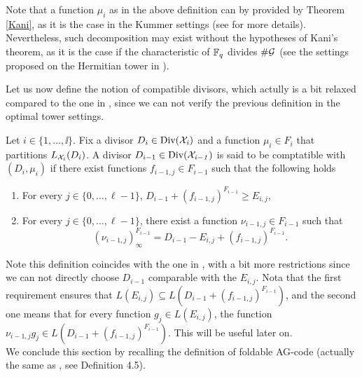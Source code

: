 \documentclass[10pt]{article}
\begin{document}
\s

\begin{rq1} \rm
Note that a function $\mu_i$ as in the above definition can by provided by Theorem \ref{Kani}, as it is the case in the Kummer settings (see \cite{IOPP} for more details). Nevertheless, such decomposition may exist without the hypotheses of Kani's theorem, as it is the case if the characteristic of $\mathbb{F}_q$ divides $\#\mathcal{G}$ (see the settings proposed on the Hermitian tower in \cite{IOPP}).
\end{rq1}

\s

Let us now define the notion of compatible divisors, which actully is a bit relaxed compared to the one in \cite{IOPP}, since we can not verify the previous definition in the optimal tower settings.

\s

\begin{def1} \label{compatible}
Let $i \in \{1,...,\ii\}$. Fix a divisor $D_i \in \rm Div \it (\mathcal{X}_i)$ and a function $\mu_i \in F_i$ that partitions $L_{\mathcal{X}_i}(D_i)$. A divisor $D_{i-1} \in \rm Div \it (\mathcal{X}_{i-1})$ is said to be comptatible with $(D_i,\mu_i)$ if there exist functions $f_{i-1,j} \in F_{i-1}$ such that the following holds
\begin{enumerate}
\item For every $j \in \{0,...,\ell-1\}$, $D_{i-1} +(f_{i-1,j})^{F_{i-1}} \geq E_{i,j}$,
\item For every $j \in \{0,...,\ell-1\}$, there exist a function $\nu_{i-1,j} \in F_{i-1}$ such that 
\begin{equation}
(\nu_{i-1,j})^{F_{i-1}}_{\infty} = D_{i-1}-E_{i,j} + (f_{i-1,j})^{F_{i-1}}.
\end{equation}
\end{enumerate}
\end{def1}

Note this definition coincides with the one in \cite{IOPP}, with a bit more restrictions since we can not directly choose $D_{i-1}$ comparable with the $E_{i,j}$. Nota that the first requirement ensures that $L(E_{i,j}) \subseteq L(D_{i-1} + (f_{i-1,j})^{F_{i-1}})$, and the second one means that for every function $g_j \in L(E_{i,j})$, the function $\nu_{i-1,j}g_j \in L(D_{i-1} + (f_{i-1,j})^{F_{i-1}})$. This will be useful later on. \\
We conclude this section by recalling the definition of foldable AG-code (actually the same as \cite{IOPP}, see Definition 4.5).
\end{document}

